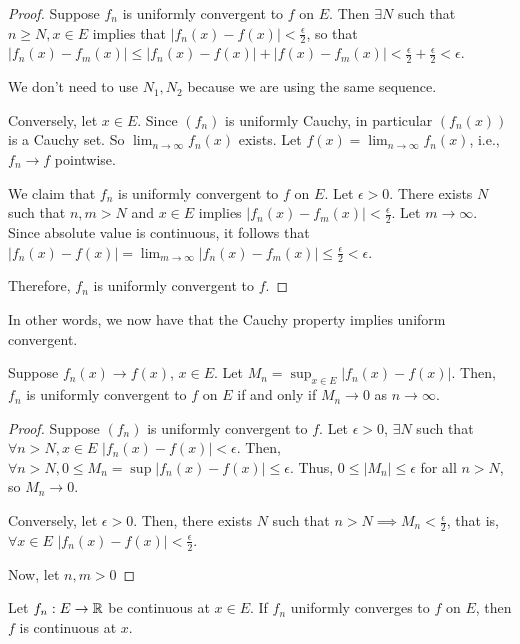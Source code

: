 \documentclass{book}
\begin{document}
\begin{proof}
    Suppose $f_n$ is uniformly convergent to $f$ on $E$. Then $\exists N$ such that $n \geq N, x \in E$ implies that $|f_n(x) - f(x)| < \frac{\epsilon}{2}$, so that 
    $|f_n(x) - f_m(x)| \leq |f_n(x) - f(x)| + |f(x) - f_m(x)| < \frac{\epsilon}{2} + \frac{\epsilon}{2} < \epsilon$.

    We don't need to use $N_1, N_2$ because we are using the same sequence.

    Conversely, let $x \in E$. Since $(f_n)$ is uniformly Cauchy, in particular $(f_n(x))$ is a Cauchy set. So $\lim_{n \to \infty} f_n(x)$ exists. Let $f(x) = \lim_{n \to \infty} f_n(x)$, i.e., $f_n \to f$ pointwise.

    We claim that $f_n$ is uniformly convergent to $f$ on $E$. Let $\epsilon > 0$. There exists $N$ such that $n, m > N$ and $x \in E$ implies $|f_n(x) - f_m(x)| < \frac{\epsilon}{2}$. Let $m \to \infty$. Since absolute value is continuous, it follows that $|f_n(x) - f(x)| = \lim_{m \to \infty} |f_n(x) - f_m(x)| \leq \frac{\epsilon}{2} < \epsilon$.

    Therefore, $f_n$ is uniformly convergent to $f$.
\end{proof}

In other words, we now have that the Cauchy property implies uniform convergent.

\begin{thm}
    Suppose $f_n(x) \to f(x)$, $x \in E$. Let $M_n = \sup_{x \in E} |f_n(x) - f(x)|$. Then, $f_n$ is uniformly convergent to $f$ on $E$ if and only if $M_n \to 0$ as $n \to \infty$.
\end{thm}

\begin{proof}
    Suppose $(f_n)$ is uniformly convergent to $f$. Let $\epsilon > 0$, $\exists N$ such that $\forall n > N, x \in E$ $|f_n(x) - f(x)| < \epsilon$. Then, $\forall n > N, 0 \leq M_n = \sup |f_n(x) - f(x)| \leq \epsilon$. Thus, $0 \leq |M_n| \leq \epsilon$ for all $n > N$, so $M_n \to 0$.

    Conversely, let $\epsilon > 0$. Then, there exists $N$ such that $n > N \implies M_n < \frac{\epsilon}{2}$, that is, $\forall x \in E$ $|f_n(x) - f(x)| < \frac{\epsilon}{2}$.
    
    Now, let $n, m > 0$
\end{proof}

\begin{thm} 
    Let $f_n : E \to \mathbb{R}$ be continuous at $x \in E$. If $f_n$ uniformly converges to $f$ on $E$, then $f$ is continuous at $x$.
\end{thm}
\end{document}
